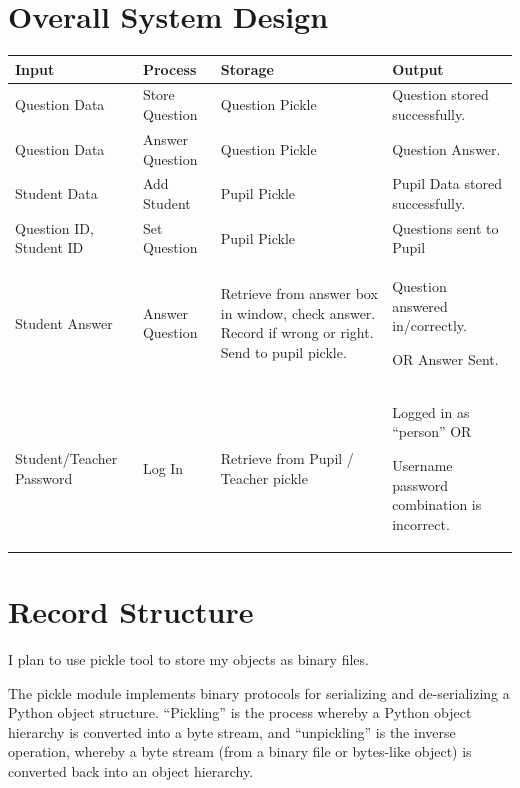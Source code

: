 \documentclass[a4paper,12pt]{report}
\begin{document}
\section{Overall System Design}


\bigskip


\bigskip

\begin{flushleft}
\tablefirsthead{}
\tablehead{}
\tabletail{}
\tablelasttail{}
\begin{supertabular}{|m{1.6566598in}|m{1.5955598in}|m{1.6011599in}|m{1.6240599in}|}
\hline
Input &
Process &
Storage &
Output\\\hline
Question Data &
Store Question &
Question Pickle &
Question stored successfully.\\\hline
Question Data &
Answer Question &
Question Pickle &
Question Answer.\\\hline
Student Data &
Add Student &
Pupil Pickle &
Pupil Data stored successfully.\\\hline
Question ID, Student ID &
Set Question &
Pupil Pickle &
Questions sent to Pupil\\\hline
Student Answer &
Answer Question &
Retrieve from answer box in window, check answer. Record if wrong or right. Send to pupil pickle. &
Question answered in/correctly.

OR\newline
Answer Sent.\\\hline
Student/Teacher Password &
Log In &
Retrieve from Pupil / Teacher pickle &
Logged in as ``person''\newline
OR

Username password combination is incorrect.\\\hline
\end{supertabular}
\end{flushleft}

\bigskip


\bigskip

\section{Record Structure}


\bigskip

I plan to use pickle tool to store my objects as binary files.

The pickle module implements binary protocols for serializing and de-serializing a Python object structure. ``Pickling'' is the process whereby a Python object hierarchy is converted into a byte stream, and ``unpickling'' is the inverse operation, whereby a byte stream (from a binary file or bytes-like object) is converted back into an object hierarchy.
\end{document}
